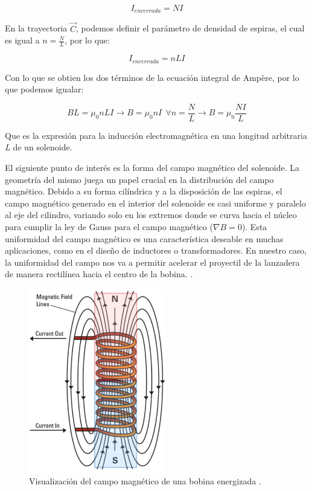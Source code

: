 \begin{center}
    \[I_{encerrada} = NI\]
\end{center}

En la trayectoria \(\vec{C}\), podemos definir el parámetro de densidad de espiras, el cual es igual a \(n=\frac{N}{L}\), por lo que:

\begin{center}
    \[I_{encerrada} = nLI\]
\end{center}

Con lo que se obtien los dos términos de la ecuación integral de Ampère, por lo que podemos igualar:

\begin{center}
    \[BL=\mu_0nLI\to B=\mu_0nI~~\forall n=\frac{N}{L}\to B=\mu_0\frac{NI}{L}\]
\end{center}

Que es la expresión para la inducción electromagnética en una longitud arbitraria \textit{L} de un solenoide.

El siguiente punto de interés es la forma del campo magnético del solenoide. La geometría del mismo juega un papel crucial en la distribución del campo magnético. Debido a su forma cilíndrica y a la disposición de las espiras, el campo magnético generado en el interior del solenoide es casi uniforme y paralelo al eje del cilindro, variando solo en los extremos donde se curva hacia el núcleo para cumplir la ley de Gauss para el campo magnético (\(\nabla B=0\)). Esta uniformidad del campo magnético es una característica deseable en muchas aplicaciones, como en el diseño de inductores o transformadores. En nuestro caso, la uniformidad del campo nos va a permitir acelerar el proyectil de la lanzadera de manera rectilínea hacia el centro de la bobina.\citep{purcell2013electricidad} \citep{griffiths2005}\citep{tipler2008}.

\begin{figure}[H]
    \centering %
    \includegraphics[width=6cm]{FigurasMemoria/electromagnet.png}
    \caption{Visualización del campo magnético de una bobina energizada \citep{northeastern2024electromagnets}.}
    \label{fig:electromagnet} %
\end{figure}

